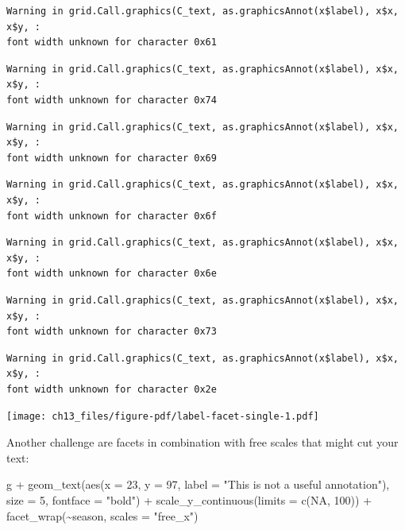 \documentclass[
  letterpaper,
]{scrbook}
\newenvironment{Shaded}{\begin{snugshade}}{\end{snugshade}}
\newcommand{\AttributeTok}[1]{\textcolor[rgb]{0.40,0.45,0.13}{#1}}
\newcommand{\ConstantTok}[1]{\textcolor[rgb]{0.56,0.35,0.01}{#1}}
\newcommand{\DecValTok}[1]{\textcolor[rgb]{0.68,0.00,0.00}{#1}}
\newcommand{\FunctionTok}[1]{\textcolor[rgb]{0.28,0.35,0.67}{#1}}
\newcommand{\NormalTok}[1]{\textcolor[rgb]{0.00,0.23,0.31}{#1}}
\newcommand{\SpecialCharTok}[1]{\textcolor[rgb]{0.37,0.37,0.37}{#1}}
\newcommand{\StringTok}[1]{\textcolor[rgb]{0.13,0.47,0.30}{#1}}
\begin{document}
\begin{verbatim}
Warning in grid.Call.graphics(C_text, as.graphicsAnnot(x$label), x$x, x$y, :
font width unknown for character 0x61
\end{verbatim}

\begin{verbatim}
Warning in grid.Call.graphics(C_text, as.graphicsAnnot(x$label), x$x, x$y, :
font width unknown for character 0x74
\end{verbatim}

\begin{verbatim}
Warning in grid.Call.graphics(C_text, as.graphicsAnnot(x$label), x$x, x$y, :
font width unknown for character 0x69
\end{verbatim}

\begin{verbatim}
Warning in grid.Call.graphics(C_text, as.graphicsAnnot(x$label), x$x, x$y, :
font width unknown for character 0x6f
\end{verbatim}

\begin{verbatim}
Warning in grid.Call.graphics(C_text, as.graphicsAnnot(x$label), x$x, x$y, :
font width unknown for character 0x6e
\end{verbatim}

\begin{verbatim}
Warning in grid.Call.graphics(C_text, as.graphicsAnnot(x$label), x$x, x$y, :
font width unknown for character 0x73
\end{verbatim}

\begin{verbatim}
Warning in grid.Call.graphics(C_text, as.graphicsAnnot(x$label), x$x, x$y, :
font width unknown for character 0x2e
\end{verbatim}

\texttt{[image: ch13\_files/figure-pdf/label-facet-single-1.pdf]}

Another challenge are facets in combination with free scales that might
cut your text:

\begin{Shaded}
\begin{Highlighting}[]
\NormalTok{g }\SpecialCharTok{+}
  \FunctionTok{geom\_text}\NormalTok{(}\FunctionTok{aes}\NormalTok{(}\AttributeTok{x =} \DecValTok{23}\NormalTok{, }\AttributeTok{y =} \DecValTok{97}\NormalTok{,}
                \AttributeTok{label =} \StringTok{"This is not a useful annotation"}\NormalTok{),}
            \AttributeTok{size =} \DecValTok{5}\NormalTok{, }\AttributeTok{fontface =} \StringTok{"bold"}\NormalTok{) }\SpecialCharTok{+}
  \FunctionTok{scale\_y\_continuous}\NormalTok{(}\AttributeTok{limits =} \FunctionTok{c}\NormalTok{(}\ConstantTok{NA}\NormalTok{, }\DecValTok{100}\NormalTok{)) }\SpecialCharTok{+}
  \FunctionTok{facet\_wrap}\NormalTok{(}\SpecialCharTok{\textasciitilde{}}\NormalTok{season, }\AttributeTok{scales =} \StringTok{"free\_x"}\NormalTok{)}
\end{Highlighting}
\end{Shaded}
\end{document}
